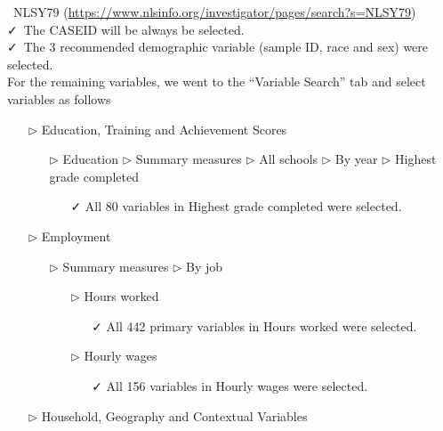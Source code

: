 \documentclass{article}
\begin{document}
\begin{tcolorbox}[label="box:data", title=Navigating the data source to download the raw data]

\faDatabase~NLSY79 (\url{https://www.nlsinfo.org/investigator/pages/search?s=NLSY79})\\
\vspace{1mm}
\faCheck~The CASEID will be always be selected.\\
\vspace{1mm}
\faCheck~The 3 recommended demographic variable (sample ID, race and sex) were selected.\\
\vspace{1mm}
For the remaining variables, we went to the ``Variable Search'' tab and select variables as follows

\begin{itemize}
\item[$\triangleright$] Education, Training and Achievement Scores
\begin{itemize}
\item[$\triangleright$] Education $\triangleright$ Summary measures $\triangleright$ All schools $\triangleright$ By year $\triangleright$ Highest grade completed
\begin{itemize}
\item[\faCheck] All 80 variables in Highest grade completed were selected.
\end{itemize}
\end{itemize}
\item[$\triangleright$] Employment
\begin{itemize}
\item[$\triangleright$] Summary measures $\triangleright$ By job
\begin{itemize}
\item[$\triangleright$] Hours worked  
\begin{itemize}
\item[\faCheck] All 442 primary variables in Hours worked were selected.
\end{itemize}
\item[$\triangleright$] Hourly wages
\begin{itemize}
\item[\faCheck] All 156 variables in Hourly wages were selected.
\end{itemize}
\end{itemize}
\end{itemize}
\item[$\triangleright$] Household, Geography and Contextual Variables

\end{itemize}
\end{tcolorbox}
\end{document}
